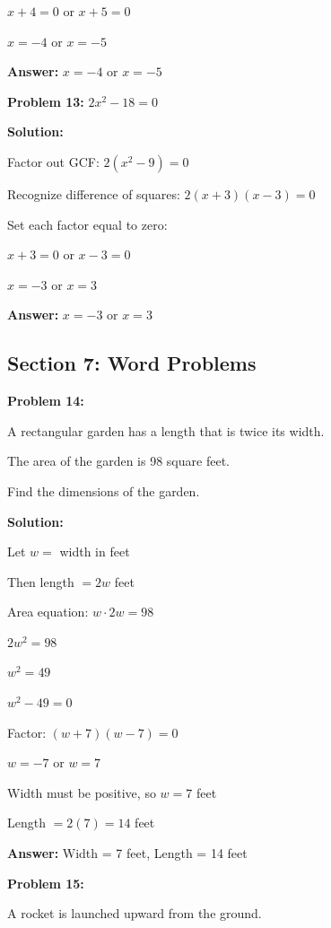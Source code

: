 \documentclass[12pt]{article}
\begin{document}
		$x + 4 = 0$ or $x + 5 = 0$
		
		$x = -4$ or $x = -5$
		
		\textbf{Answer:} $x = -4$ or $x = -5$

		\vspace{0.5cm}

		\textbf{Problem 13:} $2x^2 - 18 = 0$
		
		\textbf{Solution:}
		
		Factor out GCF: $2(x^2 - 9) = 0$
		
		Recognize difference of squares: $2(x + 3)(x - 3) = 0$
		
		Set each factor equal to zero:
		
		$x + 3 = 0$ or $x - 3 = 0$
		
		$x = -3$ or $x = 3$
		
		\textbf{Answer:} $x = -3$ or $x = 3$

	\newpage

	\subsection*{Section 7: Word Problems}

		\textbf{Problem 14:}
		
		A rectangular garden has a length that is twice its width.
		
		The area of the garden is 98 square feet.
		
		Find the dimensions of the garden.
		
		\textbf{Solution:}
		
		Let $w = $ width in feet
		
		Then length $= 2w$ feet
		
		Area equation: $w \cdot 2w = 98$
		
		$2w^2 = 98$
		
		$w^2 = 49$
		
		$w^2 - 49 = 0$
		
		Factor: $(w + 7)(w - 7) = 0$
		
		$w = -7$ or $w = 7$
		
		Width must be positive, so $w = 7$ feet
		
		Length $= 2(7) = 14$ feet
		
		\textbf{Answer:} Width = 7 feet, Length = 14 feet

		\vspace{0.5cm}


		\textbf{Problem 15:}
		
		A rocket is launched upward from the ground.
		
\end{document}
